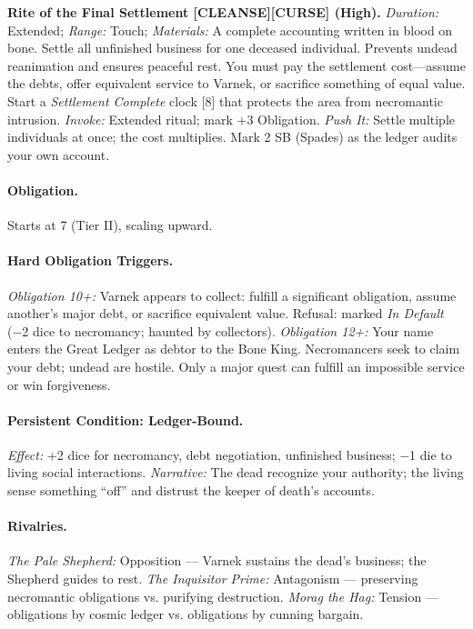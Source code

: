 \textbf{Rite of the Final Settlement [CLEANSE][CURSE] (High).}  
\emph{Duration:} Extended; \emph{Range:} Touch; \emph{Materials:} A complete accounting written in blood on bone.  
Settle all unfinished business for one deceased individual. Prevents undead reanimation and ensures peaceful rest. You must pay the settlement cost—assume the debts, offer equivalent service to Varnek, or sacrifice something of equal value. Start a \emph{Settlement Complete} clock [8] that protects the area from necromantic intrusion.  
\emph{Invoke:} Extended ritual; mark +3 Obligation.  
\emph{Push It:} Settle multiple individuals at once; the cost multiplies. Mark 2 SB (Spades) as the ledger audits your own account.

\paragraph{Obligation.} Starts at 7 (Tier II), scaling upward.

\paragraph{Hard Obligation Triggers.}  
\emph{Obligation 10+:} Varnek appears to collect: fulfill a significant obligation, assume another’s major debt, or sacrifice equivalent value. Refusal: marked \emph{In Default} (−2 dice to necromancy; haunted by collectors).  
\emph{Obligation 12+:} Your name enters the Great Ledger as debtor to the Bone King. Necromancers seek to claim your debt; undead are hostile. Only a major quest can fulfill an impossible service or win forgiveness.

\paragraph{Persistent Condition: Ledger-Bound.}  
\emph{Effect:} +2 dice for necromancy, debt negotiation, unfinished business; −1 die to living social interactions.  
\emph{Narrative:} The dead recognize your authority; the living sense something “off” and distrust the keeper of death’s accounts.

\paragraph{Rivalries.}  
\emph{The Pale Shepherd:} Opposition — Varnek sustains the dead’s business; the Shepherd guides to rest.  
\emph{The Inquisitor Prime:} Antagonism — preserving necromantic obligations vs. purifying destruction.  
\emph{Morag the Hag:} Tension — obligations by cosmic ledger vs. obligations by cunning bargain.

